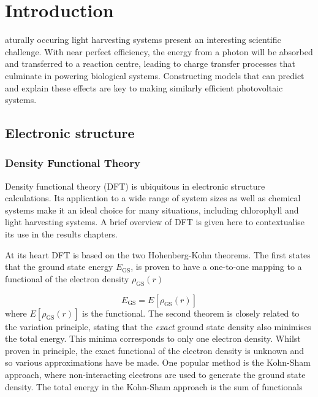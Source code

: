 %
%
\let\textcircled=\pgftextcircled
\chapter{Introduction}
\label{chap:intro}

aturally occuring light harvesting systems present an interesting 
scientific challenge. With near perfect efficiency\cite{Scholes2011}, the energy 
from a photon will be absorbed and transferred to a reaction centre, leading to 
charge transfer processes that culminate in powering biological systems. Constructing 
models that can predict and explain these effects are key to making similarly efficient 
photovoltaic systems.

\section{Electronic structure}
\label{sec:electronic_structure}

\subsection{Density Functional Theory}
\label{subsec:dft}

Density functional theory (DFT) is ubiquitous in electronic structure calculations.
Its application to a wide range of system sizes as well as chemical systems make 
it an ideal choice for many situations, including chlorophyll and light harvesting
systems. A brief overview of DFT is given here to contextualise its use in the results
chapters.

At its heart DFT is based on the two Hohenberg-Kohn theorems. The first states that
the ground state energy $E_{\text{GS}}$, is proven to have a one-to-one mapping 
to a functional of the electron density $\rho_{\text{GS}} \left(r\right)$

\begin{equation}
    E_{\text{GS}} = E \left[ \rho_{\text{GS}} \left(r\right)\right]
\end{equation}
%
where $E \left[ \rho_{\text{GS}} \left(r\right)\right]$ is the functional. The second
theorem is closely related to the variation principle, stating that the \emph{exact}
ground state density also minimises the total energy. This minima corresponds to 
only one electron density. Whilst proven in principle, the exact functional of the
electron density is unknown and so various approximations have be made. One popular
method is the Kohn-Sham approach, where non-interacting electrons are used to generate
the ground state density.  The total energy in the Kohn-Sham approach is the sum
of functionals


